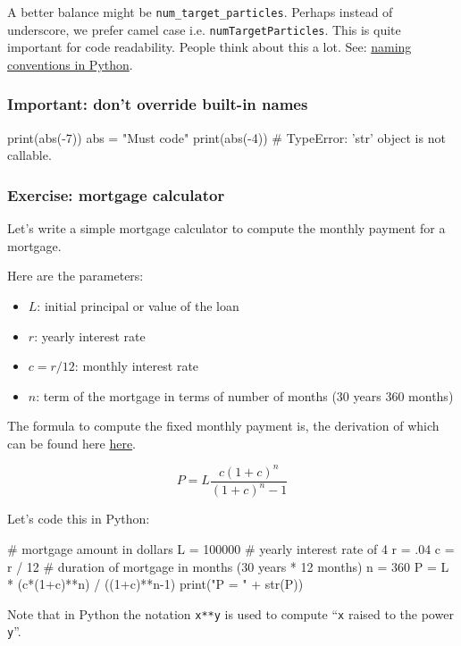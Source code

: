\documentclass[12pt,letterpaper,twoside]{article}
\begin{document}
A better balance might be
\texttt{num\_target\_particles}. Perhaps instead of underscore, we
prefer camel case i.e. \texttt{numTargetParticles}.
This is quite important for code readability. People think about this a
lot. See:
\href{https://www.python.org/dev/peps/pep-0008/\#naming-conventions}
{naming conventions in Python}.

\subsubsection{Important: don't override built-in names}

\begin{python}
print(abs(-7))
abs = "Must code"
print(abs(-4))      # TypeError: 'str' object is not callable.
\end{python}

\subsubsection{Exercise: mortgage calculator}

Let's write a simple mortgage calculator to compute the monthly payment
for a mortgage.

Here are the parameters:

\begin{itemize}
\item $L$: initial principal or value of the loan
\item $r$: yearly interest rate
\item $c = r/12$: monthly interest rate
\item $n$: term of the mortgage in terms of number of months (30 years
  360 months)
\end{itemize}

The formula to compute the fixed monthly payment is, the derivation of which can be found here \href{https://en.wikipedia.org/wiki/Mortgage_calculator#Monthly_payment_formula}{here}.

\[
P = L \frac{c(1+c)^n}{(1+c)^n-1}
\]

Let's code this in Python:

\begin{python}
# mortgage amount in dollars
L = 100000
# yearly interest rate of 4%
r = .04
c = r / 12
# duration of mortgage in months (30 years * 12 months)
n = 360
P = L * (c*(1+c)**n) / ((1+c)**n-1)
print("P = " + str(P))
\end{python}

Note that in Python the notation \texttt{x**y} is used to compute
``\texttt{x} raised to the power \texttt{y}''.
\end{document}
